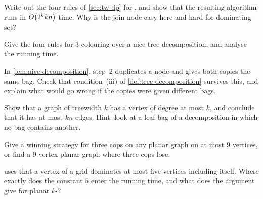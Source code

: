 \begin{exercise}
Write out the four rules of \cref{sec:tw-dp} for , and show that the resulting algorithm runs in
$O\!\left(2^k k n\right)$ time. Why is the join node easy here and hard for dominating
set?
\end{exercise}

\begin{exercise}
Give the four rules for $3$-colouring over a nice tree decomposition, and
analyse the running time.
\end{exercise}

\begin{exercise}
In \cref{lem:nice-decomposition}, step~2 duplicates a node and gives both
copies the same bag. Check that condition~(iii) of
\cref{def:tree-decomposition} survives this, and explain what would go wrong if
the copies were given different bags.
\end{exercise}

\begin{exercise}
Show that a graph of treewidth $k$ has a vertex of degree at most $k$, and
conclude that it has at most $kn$ edges. Hint: look at a leaf bag of a
decomposition in which no bag contains another.
\end{exercise}

\begin{exercise}
Give a winning strategy for three cops on any planar graph on at most $9$
vertices, or find a $9$-vertex planar graph where three cops lose.
\end{exercise}

\begin{exercise}
 uses that a vertex of a grid dominates at most
five vertices including itself. Where exactly does the constant $5$ enter the
running time, and what does the argument give for planar
$k$-?
\end{exercise}
